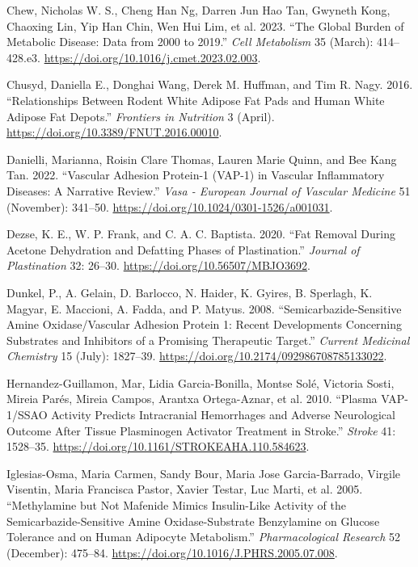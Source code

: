 \documentclass[
  letterpaper,
  DIV=11,
  numbers=noendperiod]{scrreprt}
\newlength{\cslhangindent}
\newenvironment{CSLReferences}[2] %
 {\begin{list}{}{%
  \setlength{\itemindent}{0pt}
  \setlength{\leftmargin}{0pt}
  \setlength{\parsep}{0pt}
  \ifodd #1
   \setlength{\leftmargin}{\cslhangindent}
   \setlength{\itemindent}{-1\cslhangindent}
  \fi
  \setlength{\itemsep}{#2\baselineskip}}}
 {\end{list}}
\begin{document}
\begin{CSLReferences}{1}{0}
Chew, Nicholas W. S., Cheng Han Ng, Darren Jun Hao Tan, Gwyneth Kong,
Chaoxing Lin, Yip Han Chin, Wen Hui Lim, et al. 2023. {``The Global
Burden of Metabolic Disease: Data from 2000 to 2019.''} \emph{Cell
Metabolism} 35 (March): 414--428.e3.
\url{https://doi.org/10.1016/j.cmet.2023.02.003}.

Chusyd, Daniella E., Donghai Wang, Derek M. Huffman, and Tim R. Nagy.
2016. {``Relationships Between Rodent White Adipose Fat Pads and Human
White Adipose Fat Depots.''} \emph{Frontiers in Nutrition} 3 (April).
\url{https://doi.org/10.3389/FNUT.2016.00010}.

Danielli, Marianna, Roisin Clare Thomas, Lauren Marie Quinn, and Bee
Kang Tan. 2022. {``Vascular Adhesion Protein-1 (VAP-1) in Vascular
Inflammatory Diseases: A Narrative Review.''} \emph{Vasa - European
Journal of Vascular Medicine} 51 (November): 341--50.
\url{https://doi.org/10.1024/0301-1526/a001031}.

Dezse, K. E., W. P. Frank, and C. A. C. Baptista. 2020. {``Fat Removal
During Acetone Dehydration and Defatting Phases of Plastination.''}
\emph{Journal of Plastination} 32: 26--30.
\url{https://doi.org/10.56507/MBJO3692}.

Dunkel, P., A. Gelain, D. Barlocco, N. Haider, K. Gyires, B. Sperlagh,
K. Magyar, E. Maccioni, A. Fadda, and P. Matyus. 2008.
{``Semicarbazide-Sensitive Amine Oxidase/Vascular Adhesion Protein 1:
Recent Developments Concerning Substrates and Inhibitors of a Promising
Therapeutic Target.''} \emph{Current Medicinal Chemistry} 15 (July):
1827--39. \url{https://doi.org/10.2174/092986708785133022}.

Hernandez-Guillamon, Mar, Lidia Garcia-Bonilla, Montse Solé, Victoria
Sosti, Mireia Parés, Mireia Campos, Arantxa Ortega-Aznar, et al. 2010.
{``Plasma VAP-1/SSAO Activity Predicts Intracranial Hemorrhages and
Adverse Neurological Outcome After Tissue Plasminogen Activator
Treatment in Stroke.''} \emph{Stroke} 41: 1528--35.
\url{https://doi.org/10.1161/STROKEAHA.110.584623}.

Iglesias-Osma, Maria Carmen, Sandy Bour, Maria Jose Garcia-Barrado,
Virgile Visentin, Maria Francisca Pastor, Xavier Testar, Luc Marti, et
al. 2005. {``Methylamine but Not Mafenide Mimics Insulin-Like Activity
of the Semicarbazide-Sensitive Amine Oxidase-Substrate Benzylamine on
Glucose Tolerance and on Human Adipocyte Metabolism.''}
\emph{Pharmacological Research} 52 (December): 475--84.
\url{https://doi.org/10.1016/J.PHRS.2005.07.008}.


\end{CSLReferences}
\end{document}
